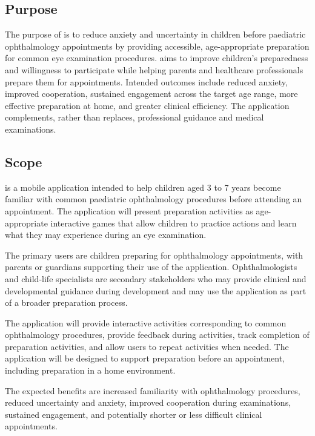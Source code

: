 \documentclass[12pt]{article}
\begin{document}
\subsection{Purpose}
\label{purpose}

The purpose of \progname{} is to reduce anxiety and uncertainty in children before paediatric
ophthalmology appointments by providing accessible, age-appropriate preparation for common eye
examination procedures. \progname{} aims to improve children's preparedness and willingness to participate while helping
parents and healthcare professionals prepare them for appointments. Intended outcomes include
reduced anxiety, improved cooperation, sustained engagement across the target age range,
more effective preparation at home, and greater clinical efficiency. The application complements,
rather than replaces, professional guidance and medical examinations.

\subsection{Scope}
\label{sec_Scope}

\progname{} is a mobile application intended to help children aged 3 to 7 years become familiar
with common paediatric ophthalmology procedures before attending an appointment. The application
will present preparation activities as age-appropriate interactive games that allow children to
practice actions and learn what they may experience during an eye examination.

The primary users are children preparing for ophthalmology appointments, with parents or guardians
supporting their use of the application. Ophthalmologists and child-life specialists are secondary
stakeholders who may provide clinical and developmental guidance during development and may use
the application as part of a broader preparation process.

The application will provide interactive activities corresponding to common ophthalmology
procedures, provide feedback during activities, track completion of preparation activities, and
allow users to repeat activities when needed. The application will be designed to support
preparation before an appointment, including preparation in a home environment.

The expected benefits are increased familiarity with ophthalmology procedures, reduced uncertainty
and anxiety, improved cooperation during examinations, sustained engagement, and potentially
shorter or less difficult clinical appointments.
\end{document}
